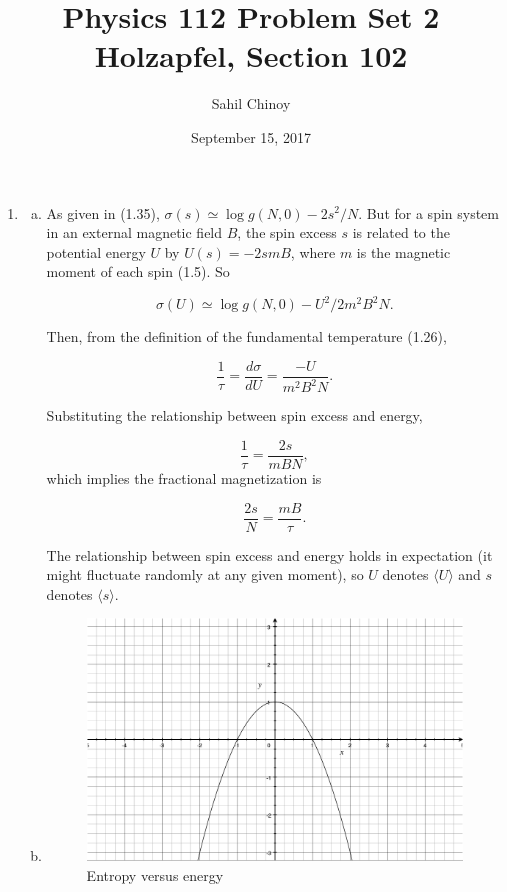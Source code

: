 \documentclass{article}
\title{Physics 112 Problem Set 2 \\ \large{Holzapfel, Section 102}}
\author{Sahil Chinoy}
\date{September 15, 2017}
\begin{document}
\maketitle{}

\begin{enumerate}

	\item 

	\begin{enumerate}[(a)]

		\item 

		As given in (1.35), $\sigma(s) \simeq \log g(N,0) - 2s^2/N$. But for a spin system in an external magnetic field $B$, the spin excess $s$ is related to the potential energy $U$ by $U(s) = -2smB$, where $m$ is the magnetic moment of each spin (1.5). So

		$$\sigma(U) \simeq \log g(N,0) - U^2/2m^2B^2N.$$

		Then, from the definition of the fundamental temperature (1.26),

		$$\frac{1}{\tau} = \frac{d \sigma}{d U} = \frac{-U}{m^2B^2N}.$$

		Substituting the relationship between spin excess and energy,

		$$\frac{1}{\tau} = \frac{2s}{mBN},$$ which implies the fractional magnetization is

		$$\frac{2s}{N} = \frac{mB}{\tau}.$$

		The relationship between spin excess and energy holds in expectation (it might fluctuate randomly at any given moment), so $U$ denotes $\langle U \rangle$ and $s$ denotes $\langle s \rangle$.

		\item

		\begin{figure}[H]
		\caption{Entropy versus energy}
		\centering
		\includegraphics[width=10cm]{img/1-entropy}
		\end{figure}


\end{enumerate}
\end{enumerate}
\end{document}
